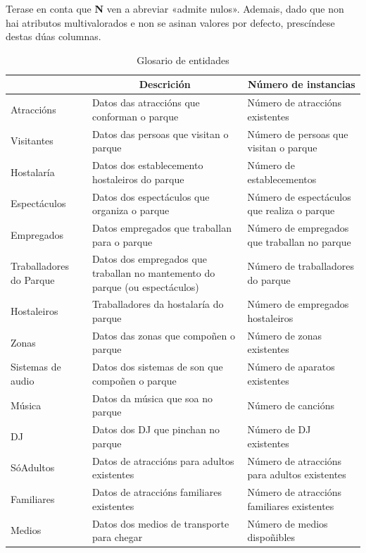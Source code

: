 \documentclass[12pt,a4paper]{book}
\theoremstyle{definition}
\theoremstyle{break}
\begin{document}
	Terase en conta que \textbf{N} ven a abreviar «admite nulos». Ademais, dado que non hai atributos multivalorados e non se asinan valores por defecto, prescíndese destas dúas columnas.
	
	\begin{table} [H] \centering
		\caption{Glosario de entidades\\}
		\begin{tabular}{|m{2.5cm}|m{5.5cm}|m{5.5cm}|}
			\hline \rowcolor{gris}
			\multicolumn{1}{|c|}{Entidades} & \multicolumn{1}{c|}{Descrición} & \multicolumn{1}{c|}{Número de instancias} \\
			\hline
			Atraccións & Datos das atraccións que conforman o parque & Número de atraccións existentes \\
			\hline
			Visitantes & Datos das persoas que visitan o parque & Número de persoas que visitan o parque \\
			\hline
			Hostalaría & Datos dos establecemento hostaleiros do parque & Número de establecementos \\
			\hline
			Espectáculos & Datos dos espectáculos que organiza o parque & Número de espectáculos que realiza o parque \\
			\hline
			Empregados & Datos empregados que traballan para o parque & Número de empregados que traballan no parque \\
			\hline
			Traballadores do Parque & Datos dos empregados que traballan no mantemento do parque (ou espectáculos) & Número de traballadores do parque \\
			\hline
			Hostaleiros & Traballadores da hostalaría do parque & Número de empregados hostaleiros  \\
			\hline
			Zonas & Datos das zonas que  compoñen o parque & Número de zonas existentes\\
			\hline
			Sistemas de audio &  Datos dos sistemas de son que compoñen o parque & Número de aparatos existentes\\
			\hline
			Música &  Datos da música que soa no parque & Número de cancións\\
			\hline
			DJ &  Datos dos DJ que pinchan no parque & Número de DJ existentes\\
			\hline
			SóAdultos & Datos de atraccións para adultos existentes & Número de atraccións para adultos existentes \\
			\hline
			Familiares & Datos de atraccións familiares existentes & Número de atraccións  familiares existentes \\
			\hline
			Medios & Datos dos medios de transporte para chegar & Número de medios  dispoñibles \\
			\hline
		\end{tabular}
	\end{table}
	
\end{document}

